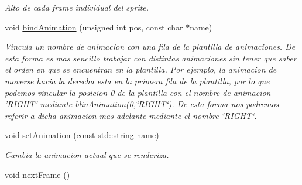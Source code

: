 \begin{DoxyCompactItemize}
\begin{DoxyCompactList}\small\item\em Alto de cada frame individual del sprite. \end{DoxyCompactList}\item 
void \hyperlink{class_sprite_sheet_a807184db56f47aca2d7a603fd82604b5}{bind\-Animation} (unsigned int pos, const char $\ast$name)
\begin{DoxyCompactList}\small\item\em Vincula un nombre de animacion con una fila de la plantilla de animaciones. De esta forma es mas sencillo trabajar con distintas animaciones sin tener que saber el orden en que se encuentran en la plantilla. Por ejemplo, la animacion de moverse hacia la derecha esta en la primera fila de la plantilla, por lo que podemos vincular la posicion 0 de la plantilla con el nombre de animacion 'R\-I\-G\-H\-T' mediante blin\-Animation(0,\char`\"{}\-R\-I\-G\-H\-T\char`\"{}). De esta forma nos podremos referir a dicha animacion mas adelante mediante el nombre \char`\"{}\-R\-I\-G\-H\-T\char`\"{}. \end{DoxyCompactList}\item 
void \hyperlink{class_sprite_sheet_aa4279b765a0c354cd748b522755ca540}{set\-Animation} (const std\-::string name)
\begin{DoxyCompactList}\small\item\em Cambia la animacion actual que se renderiza. \end{DoxyCompactList}\item 
\hypertarget{class_sprite_sheet_ae3bf1993f8494d18f9921d7428f4609c}{void \hyperlink{class_sprite_sheet_ae3bf1993f8494d18f9921d7428f4609c}{next\-Frame} ()}\label{class_sprite_sheet_ae3bf1993f8494d18f9921d7428f4609c}


\end{DoxyCompactItemize}
